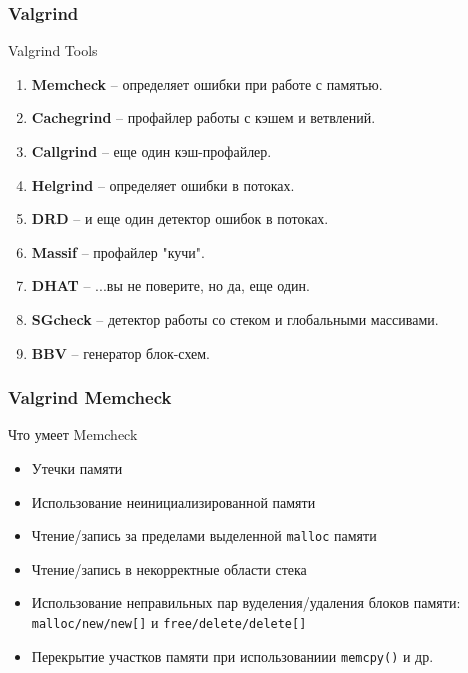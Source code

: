 \begin{frame}
	\frametitle{Valgrind}

	\begin{block}{Valgrind Tools}
		\begin{enumerate}
			\item {\bf Memcheck} -- определяет ошибки при работе с памятью.
			\item {\bf Cachegrind} -- профайлер работы с кэшем и ветвлений.
			\item {\bf Callgrind} -- еще один кэш-профайлер.
			\item {\bf Helgrind} -- определяет ошибки в потоках.
			\item {\bf DRD} -- и еще один детектор ошибок в потоках.
			\item {\bf Massif} -- профайлер "кучи".
			\item {\bf DHAT} -- ...вы не поверите, но да, еще один.
			\item {\bf SGcheck} -- детектор работы со стеком и глобальными массивами.
			\item {\bf BBV} -- генератор блок-схем.
		\end{enumerate}
	\end{block}
\end{frame}
	
\begin{frame}
	\frametitle{Valgrind Memcheck}

	\begin{block}{Что умеет Memcheck}
		\begin{itemize}
			\item Утечки памяти
			\item Использование неинициализированной памяти
			\item Чтение/запись за пределами выделенной {\tt malloc} памяти
			\item Чтение/запись в некорректные области стека
			\item Использование неправильных пар вуделения/удаления блоков памяти:\\
				{\tt malloc/new/new[]} и {\tt free/delete/delete[]}
			\item Перекрытие участков памяти при использованиии {\tt memcpy()} и др.
		\end{itemize}
	\end{block}
\end{frame}

